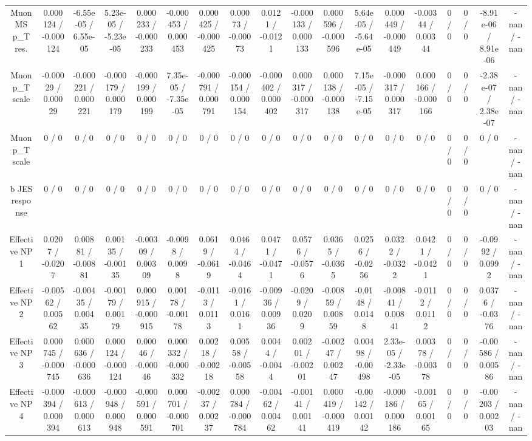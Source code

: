 \documentclass[10pt]{article}
\begin{document}
\begin{table}[htbp]
\begin{center}
\begin{tabular}{|c|c|c|c|c|c|c|c|c|c|c|c|c|c|c|c|c|c|}
  Muon MS p_{T} res. & 0.000124 / -0.000124 & -6.55e-05 / 6.55e-05 & 5.23e-05 / -5.23e-05 & 0.000233 / -0.000233 & -0.000453 / 0.000453 & 0.000425 / -0.000425 & 0.00073 / -0.00073 & 0.0121 / -0.0121 & -0.000133 / 0.000133 & 0.000596 / -0.000596 & 5.64e-05 / -5.64e-05 & 0.000449 / -0.000449 & -0.00344 / 0.00344 & 0 / 0 & 0 / 0 & -8.91e-06 / 8.91e-06 & -nan / -nan \\ 
  Muon p_{T} scale & -0.00029 / 0.00029 & -0.000221 / 0.000221 & -0.000179 / 0.000179 & -0.000199 / 0.000199 & 7.35e-05 / -7.35e-05 & -0.000791 / 0.000791 & -0.000154 / 0.000154 & -0.000402 / 0.000402 & 0.000317 / -0.000317 & 0.000138 / -0.000138 & 7.15e-05 / -7.15e-05 & -0.000317 / 0.000317 & 0.000166 / -0.000166 & 0 / 0 & 0 / 0 & -2.38e-07 / 2.38e-07 & -nan / -nan \\ 
  Muon p_{T} scale & 0 / 0 & 0 / 0 & 0 / 0 & 0 / 0 & 0 / 0 & 0 / 0 & 0 / 0 & 0 / 0 & 0 / 0 & 0 / 0 & 0 / 0 & 0 / 0 & 0 / 0 & 0 / 0 & 0 / 0 & 0 / 0 & -nan / -nan \\ 
  b JES response & 0 / 0 & 0 / 0 & 0 / 0 & 0 / 0 & 0 / 0 & 0 / 0 & 0 / 0 & 0 / 0 & 0 / 0 & 0 / 0 & 0 / 0 & 0 / 0 & 0 / 0 & 0 / 0 & 0 / 0 & 0 / 0 & -nan / -nan \\ 
  Effective NP 1 & 0.0207 / -0.0207 & 0.00881 / -0.00881 & 0.00135 / -0.00135 & -0.00309 / 0.00309 & -0.0098 / 0.0098 & 0.0619 / -0.0619 & 0.0464 / -0.0464 & 0.0471 / -0.0471 & 0.0576 / -0.0576 & 0.0365 / -0.0365 & 0.0256 / -0.0256 & 0.0322 / -0.0322 & 0.0421 / -0.0421 & 0 / 0 & 0 / 0 & -0.0992 / 0.0992 & -nan / -nan \\ 
  Effective NP 2 & -0.00562 / 0.00562 & -0.00435 / 0.00435 & -0.00179 / 0.00179 & 0.000915 / -0.000915 & 0.00178 / -0.00178 & -0.0113 / 0.0113 & -0.0161 / 0.0161 & -0.00936 / 0.00936 & -0.0209 / 0.0209 & -0.00859 / 0.00859 & -0.0148 / 0.0148 & -0.00841 / 0.00841 & -0.0112 / 0.0112 & 0 / 0 & 0 / 0 & 0.0376 / -0.0376 & -nan / -nan \\ 
  Effective NP 3 & 0.000745 / -0.000745 & 0.000636 / -0.000636 & 0.000124 / -0.000124 & 0.00046 / -0.00046 & 0.000332 / -0.000332 & 0.00218 / -0.00218 & 0.00558 / -0.00558 & 0.0044 / -0.0044 & 0.00201 / -0.00201 & -0.00247 / 0.00247 & 0.00498 / -0.00498 & 2.33e-05 / -2.33e-05 & 0.00378 / -0.00378 & 0 / 0 & 0 / 0 & -0.00586 / 0.00586 & -nan / -nan \\ 
  Effective NP 4 & -0.000394 / 0.000394 & -0.000613 / 0.000613 & -0.000948 / 0.000948 & -0.000591 / 0.000591 & 0.000701 / -0.000701 & -0.00237 / 0.00237 & 0.000784 / -0.000784 & -0.00462 / 0.00462 & -0.00141 / 0.00141 & 0.000419 / -0.000419 & -0.00142 / 0.00142 & -0.000186 / 0.000186 & -0.00165 / 0.00165 & 0 / 0 & 0 / 0 & -0.00203 / 0.00203 & -nan / -nan \\ 

\end{tabular}
\end{center}
\end{table}
\end{document}
